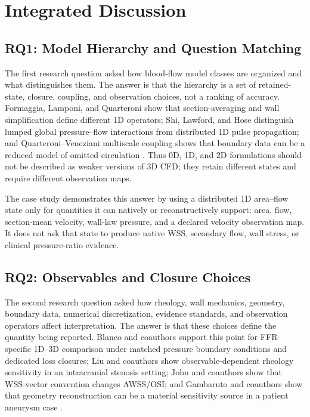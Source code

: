 \section{Integrated Discussion}
\label{sec:discussion}

\subsection{RQ1: Model Hierarchy and Question Matching}
\label{subsec:discussion-model-hierarchy-question-matching}

The first research question asked how blood-flow model classes are organized
and what distinguishes them. The answer is that the hierarchy is a set of
retained-state, closure, coupling, and observation choices, not a ranking of
accuracy. Formaggia, Lamponi, and Quarteroni show that section-averaging and
wall simplification define different 1D operators; Shi, Lawford, and Hose
distinguish lumped global pressure--flow interactions from distributed 1D pulse
propagation; and Quarteroni--Veneziani multiscale coupling shows that boundary
data can be a reduced model of omitted circulation
\cite{FormaggiaEtAl2003OneDimensionalBloodFlow,ShiEtAl2011BloodFlowModelReview,QuarteroniVeneziani2003GeometricalMultiscale}.
Thus 0D, 1D, and 2D formulations should not be described as weaker versions of
3D CFD; they retain different states and require different observation maps.

The case study demonstrates this answer by using a distributed 1D
area--flow state only for quantities it can natively or reconstructively
support: area, flow, section-mean velocity, wall-law pressure, and a declared
velocity observation map. It does not ask that state to produce native WSS,
secondary flow, wall stress, or clinical pressure-ratio evidence.

\subsection{RQ2: Observables and Closure Choices}
\label{subsec:discussion-closures-interpretability}

The second research question asked how rheology, wall mechanics, geometry,
boundary data, numerical discretization, evidence standards, and observation
operators affect interpretation. The answer is that these choices define the
quantity being reported. Blanco and coauthors support this point for
FFR-specific 1D--3D comparison under matched pressure boundary conditions and
dedicated loss closures; Liu and coauthors show observable-dependent rheology
sensitivity in an intracranial stenosis setting; John and coauthors show that
WSS-vector convention changes AWSS/OSI; and Gambaruto and coauthors show that
geometry reconstruction can be a material sensitivity source in a patient
aneurysm case
\cite{Blanco2018FFR1D3D,LiuEtAl2021ICASRheology,JohnEtAl2017WallShearStressVectorForm,GambarutoEtAl2011GeometryRheologySensitivity}.

